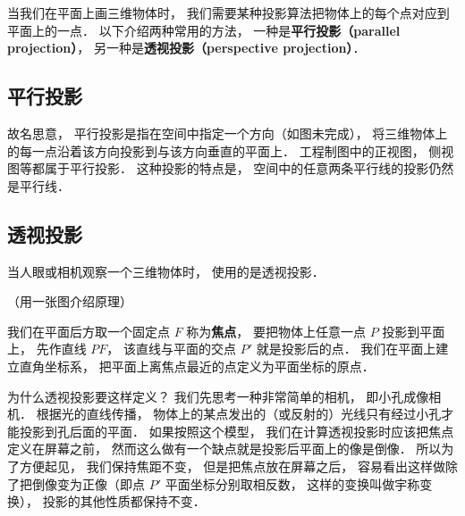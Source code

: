 

当我们在平面上画三维物体时， 我们需要某种投影算法把物体上的每个点对应到平面上的一点． 以下介绍两种常用的方法， 一种是\textbf{平行投影（parallel projection）}， 另一种是\textbf{透视投影（perspective projection）}．


\subsection{平行投影}
故名思意， 平行投影是指在空间中指定一个方向（如图未完成）， 将三维物体上的每一点沿着该方向投影到与该方向垂直的平面上． 工程制图中的正视图， 侧视图等都属于平行投影． 这种投影的特点是， 空间中的任意两条平行线的投影仍然是平行线．

\subsection{透视投影}
当人眼或相机观察一个三维物体时， 使用的是透视投影．

（用一张图介绍原理）

我们在平面后方取一个固定点 $F$ 称为\textbf{焦点}， 要把物体上任意一点 $P$ 投影到平面上， 先作直线 $PF$， 该直线与平面的交点 $P'$ 就是投影后的点． 我们在平面上建立直角坐标系， 把平面上离焦点最近的点定义为平面坐标的原点．

为什么透视投影要这样定义？ 我们先思考一种非常简单的相机， 即小孔成像相机． 根据光的直线传播， 物体上的某点发出的（或反射的）光线只有经过小孔才能投影到孔后面的平面． 如果按照这个模型， 我们在计算透视投影时应该把焦点定义在屏幕之前， 然而这么做有一个缺点就是投影后平面上的像是倒像． 所以为了方便起见， 我们保持焦距不变， 但是把焦点放在屏幕之后， 容易看出这样做除了把倒像变为正像（即点 $P'$ 平面坐标分别取相反数， 这样的变换叫做宇称变换）， 投影的其他性质都保持不变． %

